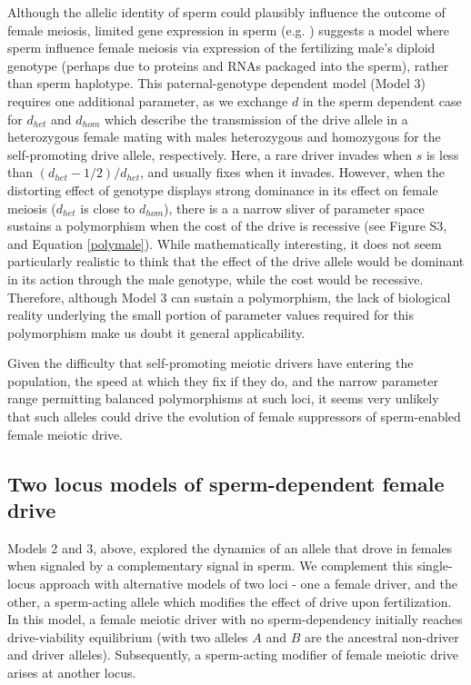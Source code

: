 \documentclass{pnastwo}
\begin{document}
\begin{article}
Although the allelic identity of sperm could plausibly influence the outcome of female meiosis, 
	limited gene expression in sperm (e.g. \cite{Joseph2004}) 
	suggests a model where sperm influence female meiosis via expression of the fertilizing male's
	diploid genotype (perhaps due to proteins and RNAs packaged into the sperm), rather than sperm haplotype.
This paternal-genotype dependent model (Model 3) requires one additional parameter, as we exchange $d$ in the sperm dependent case for $d_{het}$ and $d_{hom}$ which describe the transmission of the drive allele in a heterozygous female mating with males heterozygous and homozygous for the self-promoting drive allele, respectively.  
Here, a rare driver invades when $s$ is less than $(d_{het}-1/2)/d_{het}$, and usually fixes when it invades.
However, when the distorting effect of genotype displays strong dominance in its
	effect on female meiosis ($d_{het}$ is close to $d_{hom}$), 
	there is a a narrow sliver of parameter space sustains a polymorphism
	when the cost of the drive is recessive
	(see Figure S3, and Equation \ref{polymale}).  
While mathematically interesting, it does not seem particularly realistic to think that the
	effect of the drive allele would be dominant in its action through the
	male genotype, while the cost would be recessive. 
Therefore, although Model 3 can sustain a polymorphism, 
	the lack of biological reality underlying the small portion of parameter values 
	required for this polymorphism make us doubt it general applicability. 


Given the difficulty that self-promoting meiotic drivers have entering the population, the speed at
which they fix if they do, and the narrow parameter range permitting balanced polymorphisms at such loci,  
it seems very unlikely that such alleles could drive the evolution of female suppressors of sperm-enabled
female meiotic drive.

\subsection{Two locus models of sperm-dependent female drive}
Models 2 and 3, above, explored the dynamics of an allele that drove in females when signaled by a complementary signal in sperm.   
We complement this single-locus approach %
	with alternative models of two loci - one a female driver, 
	and the other, a sperm-acting allele which modifies the effect of drive upon fertilization. 
In this model, a female meiotic driver with no sperm-dependency 
	initially reaches drive-viability equilibrium (with two alleles
	$A$ and $B$ are the ancestral non-driver and driver alleles). 
Subsequently, a sperm-acting modifier of female meiotic drive arises at another locus. 


\end{article}
\end{document}
